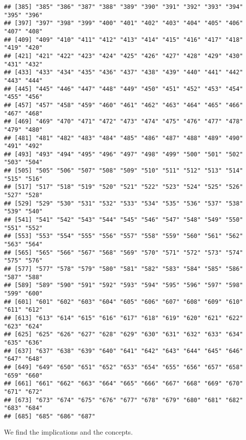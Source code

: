 \documentclass[
]{book}
\newenvironment{Shaded}{\begin{snugshade}}{\end{snugshade}}
\newcommand{\DataTypeTok}[1]{\textcolor[rgb]{0.13,0.29,0.53}{#1}}
\newcommand{\KeywordTok}[1]{\textcolor[rgb]{0.13,0.29,0.53}{\textbf{#1}}}
\newcommand{\NormalTok}[1]{#1}
\newcommand{\OperatorTok}[1]{\textcolor[rgb]{0.81,0.36,0.00}{\textbf{#1}}}
\newcommand{\StringTok}[1]{\textcolor[rgb]{0.31,0.60,0.02}{#1}}
\begin{document}
\begin{verbatim}
## [385] "385" "386" "387" "388" "389" "390" "391" "392" "393" "394" "395" "396"
## [397] "397" "398" "399" "400" "401" "402" "403" "404" "405" "406" "407" "408"
## [409] "409" "410" "411" "412" "413" "414" "415" "416" "417" "418" "419" "420"
## [421] "421" "422" "423" "424" "425" "426" "427" "428" "429" "430" "431" "432"
## [433] "433" "434" "435" "436" "437" "438" "439" "440" "441" "442" "443" "444"
## [445] "445" "446" "447" "448" "449" "450" "451" "452" "453" "454" "455" "456"
## [457] "457" "458" "459" "460" "461" "462" "463" "464" "465" "466" "467" "468"
## [469] "469" "470" "471" "472" "473" "474" "475" "476" "477" "478" "479" "480"
## [481] "481" "482" "483" "484" "485" "486" "487" "488" "489" "490" "491" "492"
## [493] "493" "494" "495" "496" "497" "498" "499" "500" "501" "502" "503" "504"
## [505] "505" "506" "507" "508" "509" "510" "511" "512" "513" "514" "515" "516"
## [517] "517" "518" "519" "520" "521" "522" "523" "524" "525" "526" "527" "528"
## [529] "529" "530" "531" "532" "533" "534" "535" "536" "537" "538" "539" "540"
## [541] "541" "542" "543" "544" "545" "546" "547" "548" "549" "550" "551" "552"
## [553] "553" "554" "555" "556" "557" "558" "559" "560" "561" "562" "563" "564"
## [565] "565" "566" "567" "568" "569" "570" "571" "572" "573" "574" "575" "576"
## [577] "577" "578" "579" "580" "581" "582" "583" "584" "585" "586" "587" "588"
## [589] "589" "590" "591" "592" "593" "594" "595" "596" "597" "598" "599" "600"
## [601] "601" "602" "603" "604" "605" "606" "607" "608" "609" "610" "611" "612"
## [613] "613" "614" "615" "616" "617" "618" "619" "620" "621" "622" "623" "624"
## [625] "625" "626" "627" "628" "629" "630" "631" "632" "633" "634" "635" "636"
## [637] "637" "638" "639" "640" "641" "642" "643" "644" "645" "646" "647" "648"
## [649] "649" "650" "651" "652" "653" "654" "655" "656" "657" "658" "659" "660"
## [661] "661" "662" "663" "664" "665" "666" "667" "668" "669" "670" "671" "672"
## [673] "673" "674" "675" "676" "677" "678" "679" "680" "681" "682" "683" "684"
## [685] "685" "686" "687"
\end{verbatim}

We find the implications and the concepts.

\begin{Shaded}
\end{Shaded}
\end{document}
